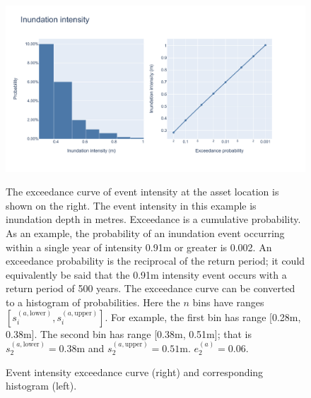 \documentclass[a4paper,11pt]{extarticle} %
\begin{document}
\begin{figure}[ht]
	
	\begin{framed}
		
		\includegraphics[width=\textwidth]{plots/fig_intensity.pdf}
		
	\end{framed}
	
	\footnotesize
	
	\renewcommand{\arraystretch}{1.01}
	
	\vspace{-3ex}
	
	{\justify
		The exceedance curve of event intensity at the asset location is shown on the right. The event intensity in this example is inundation depth in metres. Exceedance is a cumulative probability. As an example, the probability of an inundation event occurring within a single year of intensity 0.91m or greater is 0.002. An exceedance probability is the reciprocal of the return period; it could equivalently be said that the 0.91m intensity event occurs with a return period of 500 years.
		The exceedance curve can be converted to a histogram of probabilities. Here the $n$ bins have ranges $[s^{(a, \text{lower})}_i, s^{(a, \text{upper})}_i]$. For example, the first bin has range [0.28m, 0.38m]. The second bin has range [0.38m,	0.51m]; that is $s^{(a, \text{lower})}_2 = 0.38$m and $s^{(a, \text{upper})}_2 = 0.51$m. $e^{(a)}_2 = 0.06$.	
		\par}
	
	\vspace{-0.5ex}
	
	\caption{\small Event intensity exceedance curve (right) and corresponding histogram (left).}
	\label{Fig:intensity}
	
\end{figure}
\end{document}
